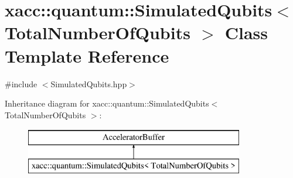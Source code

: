 \hypertarget{a00279}{}\section{xacc\+:\+:quantum\+:\+:Simulated\+Qubits$<$ Total\+Number\+Of\+Qubits $>$ Class Template Reference}
\label{a00279}


{\ttfamily \#include $<$Simulated\+Qubits.\+hpp$>$}

Inheritance diagram for xacc\+:\+:quantum\+:\+:Simulated\+Qubits$<$ Total\+Number\+Of\+Qubits $>$\+:\begin{figure}[H]
\begin{center}
\leavevmode
\includegraphics[height=2.000000cm]{a00279}
\end{center}
\end{figure}
